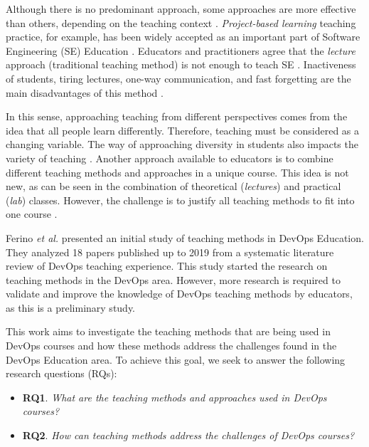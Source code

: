 \documentclass[10pt,conference]{IEEEtran}
\begin{document}
Although there is no predominant approach, some approaches are more effective than others, depending on the teaching context \cite{marques:2014}. \textsl{Project-based learning} teaching practice, for example, has been widely accepted as an important part of Software Engineering (SE) Education \cite{bai:2018, chatley:2017, moreno:2016}. Educators and practitioners agree that the \textsl{lecture} approach (traditional teaching method) is not enough to teach SE \cite{chen:2009}. Inactiveness of students, tiring lectures, one-way communication, and fast forgetting are the main disadvantages of this method \cite{sadeghi:2014, norouzi:2011}.

In this sense, approaching teaching from different perspectives comes from the idea that all people learn differently. Therefore, teaching must be considered as a changing variable. The way of approaching diversity in students also impacts the variety of teaching \cite{chen:2009}. Another approach available to educators is to combine different teaching methods and approaches in a unique course. This idea is not new, as can be seen in the combination of theoretical (\textsl{lectures}) and practical (\textsl{lab}) classes. However, the challenge is to justify all teaching methods to fit into one course \cite{kuhrmann:2012}.



Ferino \textit{et al.} \cite{ferino:2021} presented an initial study of teaching methods in DevOps Education. They analyzed 18 papers published up to 2019 from a systematic literature review of DevOps teaching experience. This study started the research on teaching methods in the DevOps area.  However, more research is required to validate and improve the knowledge of DevOps teaching methods by educators, as this is a preliminary study. 

This work aims to investigate the teaching methods that are being used in DevOps courses and how these methods address the challenges found in the DevOps Education area. To achieve this goal, we seek to answer the following research questions (RQs):


{\renewcommand\labelitemi{}
\begin{itemize}[leftmargin=*]
\item  \textbf{RQ1}. \textit{What are the teaching methods and approaches used in DevOps courses?}
\item  \textbf{RQ2}. \textit{How can teaching methods address the challenges of DevOps courses?}
\end{itemize}
}
\end{document}
